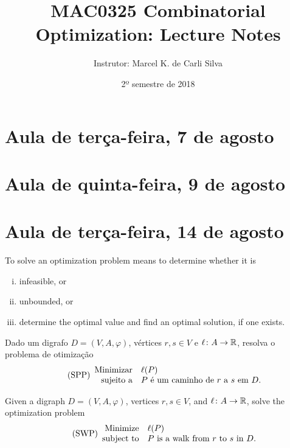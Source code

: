 \documentclass[10pt,reqno]{amsart}
\title{MAC0325 Combinatorial Optimization: Lecture Notes}
\author{Instrutor: Marcel {K.} de Carli Silva}
\date{2º semestre de 2018}
\begin{document}
\begin{abstract}

\end{abstract}

\maketitle

\tableofcontents

\section{Aula de terça-feira, 7 de agosto}

\section{Aula de quinta-feira, 9 de agosto}

\section{Aula de terça-feira, 14 de agosto}

To solve an optimization problem means to determine whether it is
\begin{enumerate}[(i)]
\item infeasible, or
\item unbounded, or
\item determine the optimal value and find an optimal solution, if one
  exists.
\end{enumerate}

\begin{problem*}
  Dado um digrafo \(D = (V,A,\varphi)\), vértices \(r,s \in V\) e
  \(\ell \colon A \to \mathbb{R}\), resolva o problema de otimização
  \begin{equation}
    \label{eq:1}
    \tag{SPP}
    \begin{array}{{rl}}
      \text{Minimizar} & \ell(P) \\
      \text{sujeito a} & \text{\(P\) é um caminho de \(r\) a \(s\) em~\(D\)}.
    \end{array}
  \end{equation}
\end{problem*}

\begin{problem*}
  Given a digraph \(D = (V,A,\varphi)\), vertices \(r,s \in V\), and
  \(\ell \colon A \to \mathbb{R}\), solve the optimization problem
  \begin{equation}
    \label{eq:2}
    \tag{SWP}
    \begin{array}{{rl}}
      \text{Minimize}   & \ell(P) \\
      \text{subject to} & \text{\(P\) is a walk from \(r\) to \(s\) in~\(D\)}.
    \end{array}
  \end{equation}
\end{problem*}
\end{document}
